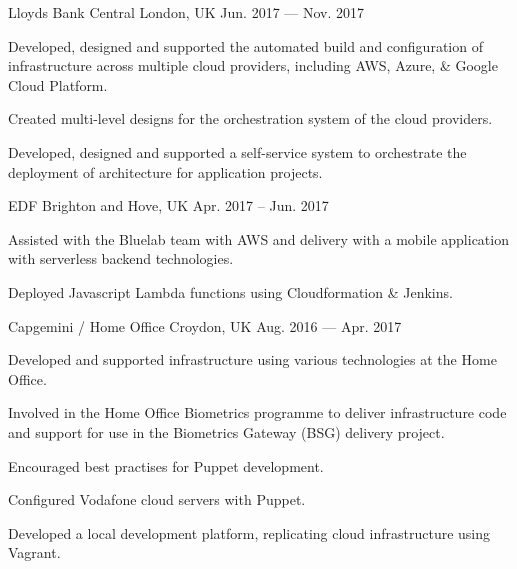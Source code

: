\begin{cventries}
    {Lloyds Bank}
    {Central London, UK}
    {Jun. 2017 — Nov. 2017}
    {
        \begin{cvitems}
        \item {Developed, designed and supported the automated build and configuration of infrastructure across multiple cloud providers, including AWS, Azure, \& Google Cloud Platform.}
        \item {Created multi-level designs for the orchestration system of the cloud providers.}
        \item {Developed, designed and supported a self-service system to orchestrate the deployment of architecture for application projects.}
        \end{cvitems}
    }

    {EDF} %
    {Brighton and Hove, UK} %
    {Apr. 2017 -- Jun. 2017} %
    {
        \begin{cvitems} %
        \item {Assisted with the Bluelab team with AWS and delivery with a mobile application with serverless backend technologies.}
        \item {Deployed Javascript Lambda functions using Cloudformation \& Jenkins.}
        \end{cvitems}
    }


    {Capgemini / Home Office} %
    {Croydon, UK} %
    {Aug. 2016 — Apr. 2017} %
    {
        \begin{cvitems} %
        \item {Developed and supported infrastructure using various technologies at the Home Office.}
        \item {Involved in the Home Office Biometrics programme to deliver infrastructure code and support for use in the Biometrics Gateway (BSG) delivery project.}
        \item {Encouraged best practises for Puppet development.}
        \item {Configured Vodafone cloud servers with Puppet.}
        \item {Developed a local development platform, replicating cloud infrastructure using Vagrant.}
        \end{cvitems}
    }



\end{cventries}
